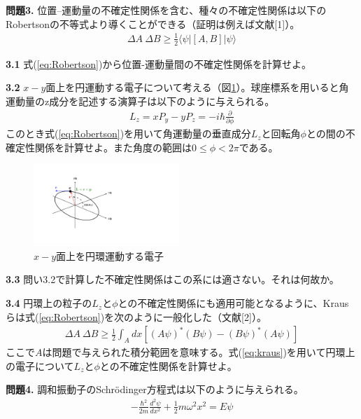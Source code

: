 \documentclass[11pt,pra,aps]{revtex4}
\begin{document}
\noindent
{\bf 問題3.} 位置–運動量の不確定性関係を含む、種々の不確定性関係は以下のRobertsonの不等式より導くことができる（証明は例えば文献[1]）。
\begin{align}
  \Delta A\ \Delta B \geq \frac{1}{2}\langle\psi|[A,B]|\psi\rangle\label{eq:Robertson}
\end{align}

\noindent
{\bf 3.1} 式(\ref{eq:Robertson})から位置-運動量間の不確定性関係を計算せよ。

\noindent
{\bf 3.2} $x-y$面上を円運動する電子について考える（図\ref{fig:circ}）。球座標系を用いると角運動量のz成分を記述する演算子は以下のように与えられる。
\begin{align}
  L_z=xP_y-yP_z=-i\hbar\frac{\partial}{\partial \phi}
\end{align}
このとき式(\ref{eq:Robertson})を用いて角運動量の垂直成分$L_z$と回転角$\phi$との間の不確定性関係を計算せよ。また角度の範囲は$0\leq \phi < 2\pi$である。

\begin{figure}
  \centering
  \includegraphics[width=5.5cm]{circular-motion.pdf}
  \caption{\label{fig:circ} $x-y$面上を円環運動する電子}
\end{figure}

\noindent
{\bf 3.3} 問い3.2で計算した不確定性関係はこの系には適さない。それは何故か。

\noindent
{\bf 3.4} 円環上の粒子の$L_z$と$\phi$との不確定性関係にも適用可能となるように、Krausらは式(\ref{eq:Robertson})を次のように一般化した（文献[2]）。
\begin{align}
  \Delta A\ \Delta B \geq \frac{1}{2}\int_A dx \left[(A\psi)^{*} (B\psi) - (B\psi)^{*} (A\psi)\right]\label{eq:kraus}
\end{align}
ここで$A$は問題で与えられた積分範囲を意味する。式(\ref{eq:kraus})を用いて円環上の電子について$L_z$と$\phi$との不確定性関係を計算せよ。

\noindent
{\bf 問題4.} 調和振動子のSchr\"odinger方程式は以下のように与えられる。
\begin{align}
  -\frac{\hbar^2}{2m}\frac{d^2\psi}{dx^2}+\frac{1}{2}m\omega^2x^2=E\psi \label{eq:harm}
\end{align}
\end{document}
